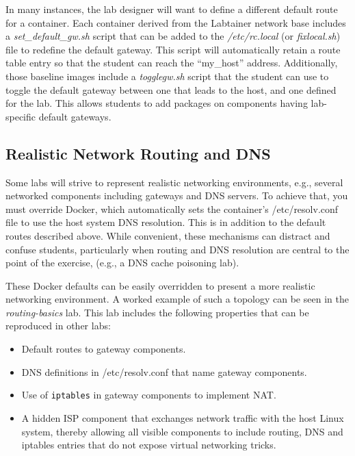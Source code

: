 \documentclass[12pt]{article}
\begin{document}
In many instances, the lab designer will want to define a different default route for a 
container.  Each container derived from the Labtainer network base includes a \textit{set\_default\_gw.sh}
script that can be added to the \textit{/etc/rc.local} (or \textit{fixlocal.sh}) file to redefine the default gateway.
This script will automatically retain a route table entry so that the student can reach the ``my\_host''
address.  Additionally, those baseline images include a \textit{togglegw.sh} script that the student
can use to toggle the default gateway between one that leads to the host, and one defined for the lab.
This allows students to add packages on components having lab-specific default gateways.

\subsection{Realistic Network Routing and DNS}
Some labs will strive to represent realistic networking environments, 
e.g., several networked components including gateways and DNS servers.
To achieve that, you must override Docker, which automatically sets 
the container's /etc/resolv.conf file to use the
host system DNS resolution.  This is in addition to the default routes described
above.  While convenient, these mechanisms can distract and confuse students, particularly
when routing and DNS resolution are central to the point of the exercise, (e.g.,
a DNS cache poisoning lab).

These Docker defaults can be easily overridden to present a more realistic networking
environment.  A worked example of such a topology can be seen in the \textit{routing-basics} lab.
This lab includes the following properties that can be reproduced in other labs:
\begin{itemize}
\item Default routes to gateway components.
\item DNS definitions in /etc/resolv.conf that name gateway components.
\item Use of \texttt{iptables} in gateway components to implement NAT.
\item A hidden ISP component that exchanges network traffic with the host Linux system,
thereby allowing all visible components to include routing, DNS and iptables entries that do not
expose virtual networking tricks.

\end{itemize}
\end{document}

